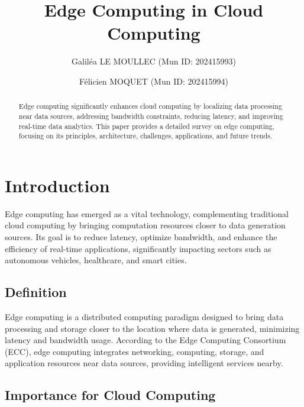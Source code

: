 \documentclass[runningheads]{llncs}
\begin{document}
\title{Edge Computing in Cloud Computing}

\author{Galiléa LE MOULLEC (Mun ID: 202415993) \and Félicien MOQUET (Mun ID: 202415994)}

\maketitle

\begin{abstract}
Edge computing significantly enhances cloud computing by localizing data processing near data sources, addressing bandwidth constraints, reducing latency, and improving real-time data analytics. This paper provides a detailed survey on edge computing, focusing on its principles, architecture, challenges, applications, and future trends.

\end{abstract}

\section{Introduction}
Edge computing has emerged as a vital technology, complementing traditional cloud computing by bringing computation resources closer to data generation sources. Its goal is to reduce latency, optimize bandwidth, and enhance the efficiency of real-time applications, significantly impacting sectors such as autonomous vehicles, healthcare, and smart cities.

\subsection{Definition}
Edge computing is a distributed computing paradigm designed to bring data processing and storage closer to the location where data is generated, minimizing latency and bandwidth usage. According to the Edge Computing Consortium (ECC), edge computing integrates networking, computing, storage, and application resources near data sources, providing intelligent services nearby.

\subsection{Importance for Cloud Computing}
\end{document}
